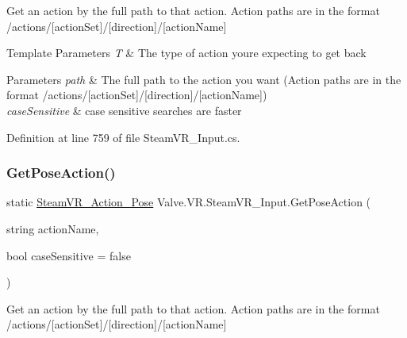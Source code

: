 Get an action by the full path to that action. Action paths are in the format /actions/\mbox{[}action\+Set\mbox{]}/\mbox{[}direction\mbox{]}/\mbox{[}action\+Name\mbox{]} 


\begin{DoxyTemplParams}{Template Parameters}
{\em T} & The type of action you\textquotesingle{}re expecting to get back\\
\hline
\end{DoxyTemplParams}

\begin{DoxyParams}{Parameters}
{\em path} & The full path to the action you want (Action paths are in the format /actions/\mbox{[}action\+Set\mbox{]}/\mbox{[}direction\mbox{]}/\mbox{[}action\+Name\mbox{]})\\
\hline
{\em case\+Sensitive} & case sensitive searches are faster\\
\hline
\end{DoxyParams}


Definition at line 759 of file Steam\+V\+R\+\_\+\+Input.\+cs.

\mbox{\label{class_valve_1_1_v_r_1_1_steam_v_r___input_aa5711fcd08017cef2fd97a8eed2770a9}} 
\subsubsection{\texorpdfstring{GetPoseAction()}{GetPoseAction()}\hspace{0.1cm}{\footnotesize\ttfamily [2/2]}}
{\footnotesize\ttfamily static \mbox{\hyperlink{class_valve_1_1_v_r_1_1_steam_v_r___action___pose}{Steam\+V\+R\+\_\+\+Action\+\_\+\+Pose}} Valve.\+V\+R.\+Steam\+V\+R\+\_\+\+Input.\+Get\+Pose\+Action (\begin{DoxyParamCaption}\item[{string}]{action\+Name,  }\item[{bool}]{case\+Sensitive = {\ttfamily false} }\end{DoxyParamCaption})\hspace{0.3cm}{\ttfamily [static]}}



Get an action by the full path to that action. Action paths are in the format /actions/\mbox{[}action\+Set\mbox{]}/\mbox{[}direction\mbox{]}/\mbox{[}action\+Name\mbox{]} 



